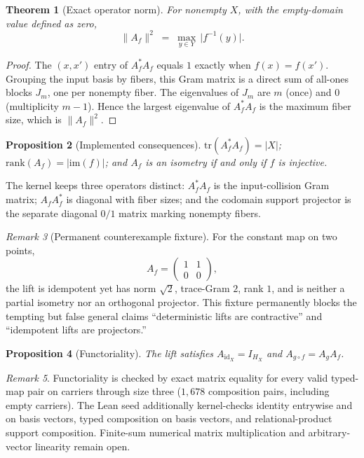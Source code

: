\documentclass[11pt]{amsart}
\newtheorem{theorem}{Theorem}[section]
\newtheorem{proposition}[theorem]{Proposition}
\theoremstyle{definition}
\theoremstyle{remark}
\newtheorem{remark}[theorem]{Remark}
\newcommand{\id}{\mathrm{id}}
\newcommand{\im}{\mathrm{im}}
\newcommand{\rank}{\mathrm{rank}}
\newcommand{\tr}{\mathrm{tr}}
\begin{document}
\begin{theorem}[Exact operator norm]\label{thm:norm}
For nonempty $X$, with the empty-domain value defined as zero,
\[
\lVert A_f \rVert^2 \;=\; \max_{y \in Y}\, \bigl|f^{-1}(y)\bigr| .
\]
\end{theorem}

\begin{proof}
The $(x,x')$ entry of $A_f^{*} A_f$ equals $1$ exactly when $f(x)=f(x')$. Grouping the input basis by fibers, this Gram matrix is a direct sum of all-ones blocks $J_m$, one per nonempty fiber. The eigenvalues of $J_m$ are $m$ (once) and $0$ (multiplicity $m-1$). Hence the largest eigenvalue of $A_f^{*}A_f$ is the maximum fiber size, which is $\lVert A_f\rVert^2$.
\end{proof}

\begin{proposition}[Implemented consequences]\label{prop:conseq}
$\tr(A_f^{*}A_f) = |X|$; $\rank(A_f) = |\im(f)|$; and $A_f$ is an isometry if and only if $f$ is injective.
\end{proposition}

The kernel keeps three operators distinct: $A_f^{*}A_f$ is the input-collision Gram matrix; $A_f A_f^{*}$ is diagonal with fiber sizes; and the codomain support projector is the separate diagonal $0/1$ matrix marking nonempty fibers.

\begin{remark}[Permanent counterexample fixture]\label{rem:constant}
For the constant map on two points,
\[
A_f = \begin{pmatrix} 1 & 1 \\ 0 & 0 \end{pmatrix},
\]
the lift is idempotent yet has norm $\sqrt{2}$, trace-Gram $2$, rank $1$, and is neither a partial isometry nor an orthogonal projector. This fixture permanently blocks the tempting but false general claims ``deterministic lifts are contractive'' and ``idempotent lifts are projectors.''
\end{remark}

\begin{proposition}[Functoriality]\label{prop:functor}
The lift satisfies $A_{\id_X} = I_{H_X}$ and $A_{g \circ f} = A_g A_f$.
\end{proposition}

\begin{remark}
Functoriality is checked by exact matrix equality for every valid typed-map pair on carriers through size three ($1{,}678$ composition pairs, including empty carriers). The Lean seed additionally kernel-checks identity entrywise and on basis vectors, typed composition on basis vectors, and relational-product support composition. Finite-sum numerical matrix multiplication and arbitrary-vector linearity remain open.
\end{remark}
\end{document}
